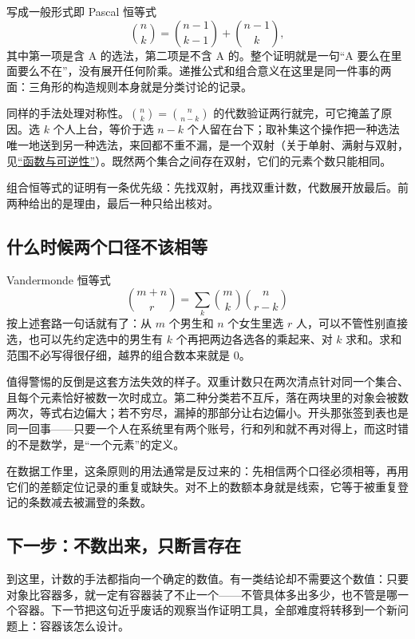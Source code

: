 写成一般形式即 Pascal 恒等式
\[
\binom nk=\binom{n-1}{k-1}+\binom{n-1}k,
\]
其中第一项是含 A 的选法，第二项是不含 A 的。整个证明就是一句``A 要么在里面要么不在''，没有展开任何阶乘。递推公式和组合意义在这里是同一件事的两面：三角形的构造规则本身就是分类讨论的记录。

同样的手法处理对称性。\(\binom nk=\binom n{n-k}\) 的代数验证两行就完，可它掩盖了原因。选 \(k\) 个人上台，等价于选 \(n-k\) 个人留在台下；取补集这个操作把一种选法唯一地送到另一种选法，来回都不重不漏，是一个双射（关于单射、满射与双射，见\hyperref[sec:01-Mathematical-Language/02-Sets-Relations-Functions/04]{``函数与可逆性''}）。既然两个集合之间存在双射，它们的元素个数只能相同。

组合恒等式的证明有一条优先级：先找双射，再找双重计数，代数展开放最后。前两种给出的是理由，最后一种只给出核对。

\subsection{什么时候两个口径不该相等}

Vandermonde 恒等式
\[
\binom{m+n}r=\sum_k\binom mk\binom n{r-k}
\]
按上述套路一句话就有了：从 \(m\) 个男生和 \(n\) 个女生里选 \(r\) 人，可以不管性别直接选，也可以先约定选中的男生有 \(k\) 个再把两边各选各的乘起来、对 \(k\) 求和。求和范围不必写得很仔细，越界的组合数本来就是 0。

值得警惕的反倒是这套方法失效的样子。双重计数只在两次清点针对同一个集合、且每个元素恰好被数一次时成立。第二种分类若不互斥，落在两块里的对象会被数两次，等式右边偏大；若不穷尽，漏掉的那部分让右边偏小。开头那张签到表也是同一回事——只要一个人在系统里有两个账号，行和列和就不再对得上，而这时错的不是数学，是``一个元素''的定义。

在数据工作里，这条原则的用法通常是反过来的：先相信两个口径必须相等，再用它们的差额定位记录的重复或缺失。对不上的数额本身就是线索，它等于被重复登记的条数减去被漏登的条数。

\subsection{下一步：不数出来，只断言存在}

到这里，计数的手法都指向一个确定的数值。有一类结论却不需要这个数值：只要对象比容器多，就一定有容器装了不止一个——不管具体多出多少，也不管是哪一个容器。下一节把这句近乎废话的观察当作证明工具，全部难度将转移到一个新问题上：容器该怎么设计。
